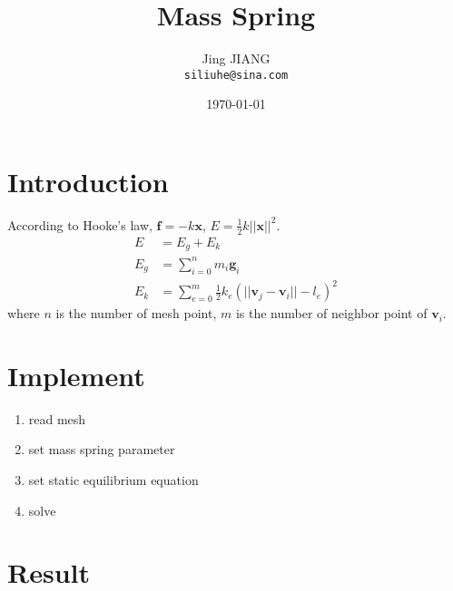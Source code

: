 \documentclass{article}
\title{Mass Spring} %
\author{Jing JIANG\\ \texttt{siliuhe@sina.com}} %
\date{%
  \today} %
\begin{document}
\maketitle %


\section*{Introduction} %

According to Hooke's law, $\bm{f} = -k\bm{x}$, $E=\frac{1}{2}k{||\bm{x}||}^2$.
\begin{equation*}
  \begin{split}
    E&=E_g+E_k  \\
    E_g&=\sum_{i=0}^{n}m_i\bm{g}_i  \\
    E_k&=\sum_{e=0}^{m}\frac{1}{2}k_e({||\bm{v}_j-\bm{v}_i||-l_e})^2
  \end{split}
\end{equation*}
where $n$ is the number of mesh point, $m$ is the number of neighbor point of $\bm{v}_i$.
\section*{Implement}
\begin{enumerate}
\item read mesh
\item set mass spring parameter
\item set static equilibrium equation
\item solve
\end{enumerate}
\section*{Result}
\end{document}
